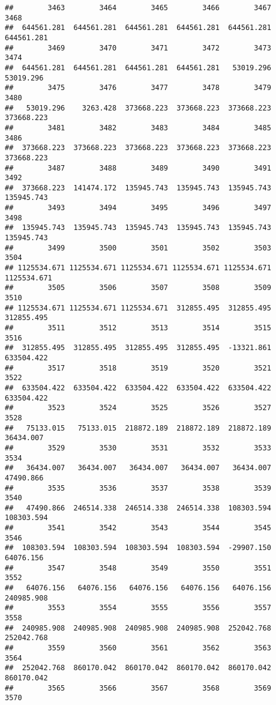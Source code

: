 \documentclass[
]{book}
\begin{document}
\begin{verbatim}
##        3463        3464        3465        3466        3467        3468 
##  644561.281  644561.281  644561.281  644561.281  644561.281  644561.281 
##        3469        3470        3471        3472        3473        3474 
##  644561.281  644561.281  644561.281  644561.281   53019.296   53019.296 
##        3475        3476        3477        3478        3479        3480 
##   53019.296    3263.428  373668.223  373668.223  373668.223  373668.223 
##        3481        3482        3483        3484        3485        3486 
##  373668.223  373668.223  373668.223  373668.223  373668.223  373668.223 
##        3487        3488        3489        3490        3491        3492 
##  373668.223  141474.172  135945.743  135945.743  135945.743  135945.743 
##        3493        3494        3495        3496        3497        3498 
##  135945.743  135945.743  135945.743  135945.743  135945.743  135945.743 
##        3499        3500        3501        3502        3503        3504 
## 1125534.671 1125534.671 1125534.671 1125534.671 1125534.671 1125534.671 
##        3505        3506        3507        3508        3509        3510 
## 1125534.671 1125534.671 1125534.671  312855.495  312855.495  312855.495 
##        3511        3512        3513        3514        3515        3516 
##  312855.495  312855.495  312855.495  312855.495  -13321.861  633504.422 
##        3517        3518        3519        3520        3521        3522 
##  633504.422  633504.422  633504.422  633504.422  633504.422  633504.422 
##        3523        3524        3525        3526        3527        3528 
##   75133.015   75133.015  218872.189  218872.189  218872.189   36434.007 
##        3529        3530        3531        3532        3533        3534 
##   36434.007   36434.007   36434.007   36434.007   36434.007   47490.866 
##        3535        3536        3537        3538        3539        3540 
##   47490.866  246514.338  246514.338  246514.338  108303.594  108303.594 
##        3541        3542        3543        3544        3545        3546 
##  108303.594  108303.594  108303.594  108303.594  -29907.150   64076.156 
##        3547        3548        3549        3550        3551        3552 
##   64076.156   64076.156   64076.156   64076.156   64076.156  240985.908 
##        3553        3554        3555        3556        3557        3558 
##  240985.908  240985.908  240985.908  240985.908  252042.768  252042.768 
##        3559        3560        3561        3562        3563        3564 
##  252042.768  860170.042  860170.042  860170.042  860170.042  860170.042 
##        3565        3566        3567        3568        3569        3570 

\end{verbatim}
\end{document}

